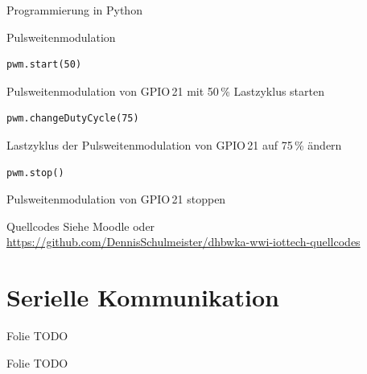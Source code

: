 {\begin{frame}{Programmierung in Python}
\begin{block}{Pulsweitenmodulation}
        \begin{lstlisting}[style=MethodenListe, gobble=12]
            pwm.start(50)
        \end{lstlisting}
        Pulsweitenmodulation von GPIO\,21 mit 50\,\% Lastzyklus starten
        \medskip

        \begin{lstlisting}[style=MethodenListe, gobble=12]
            pwm.changeDutyCycle(75)
        \end{lstlisting}
        Lastzyklus der Pulsweitenmodulation von GPIO\,21 auf 75\,\% ändern
        \medskip

        \begin{lstlisting}[style=MethodenListe, gobble=12]
            pwm.stop()
        \end{lstlisting}
        Pulsweitenmodulation von GPIO\,21 stoppen
        \medskip
    \end{block}
\end{frame}
}

\begin{frame}{Quellcodes}
    Siehe Moodle oder \\
    {
        \small
        \url{https://github.com/DennisSchulmeister/dhbwka-wwi-iottech-quellcodes}
    }

    \smallskip
    \setlength{\fboxsep}{0em}
\end{frame}

\section{Serielle Kommunikation}


\begin{frame}{Folie}
    TODO
\end{frame}

\begin{frame}{Folie}
    TODO
\end{frame}
